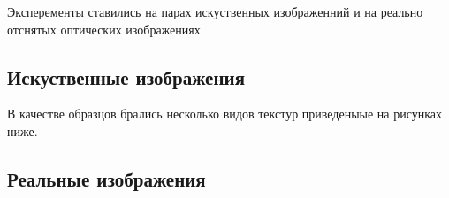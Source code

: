 Эксперементы ставились на парах искуственных изображенний и на реально отснятых оптических изображениях

\subsection{Искуственные изображения}
В качестве образцов брались несколько видов текстур приведеныые на рисунках ниже.
\subsection{Реальные изображения}
